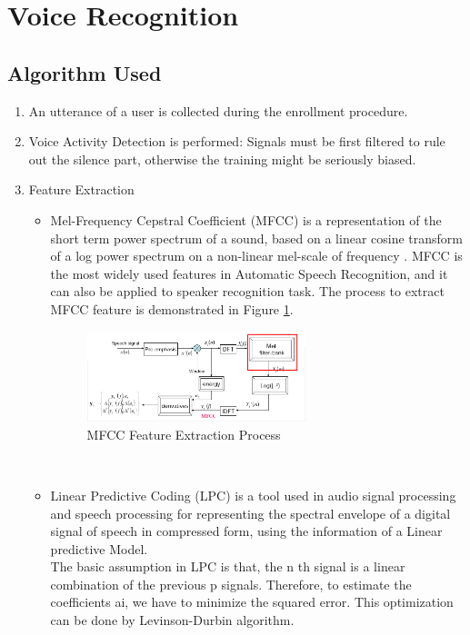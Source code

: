 
\section{Voice Recognition}

\subsection{Algorithm Used}
\begin{enumerate}
  \item An utterance of a user is collected during the enrollment procedure.
  \item Voice Activity Detection is performed: Signals must be first filtered to rule out the silence part, otherwise the training might be seriously biased.
  \item Feature Extraction
    \begin{itemize}
      \item Mel-Frequency Cepstral Coefficient (MFCC) is a representation of the short term power spectrum of a sound, based on a linear cosine transform of a log power spectrum on a non-linear mel-scale of frequency . MFCC is the most widely used features in Automatic Speech Recognition, and it can also be applied to speaker recognition task. The process to extract MFCC feature is demonstrated in Figure \ref{fig:MFCC_fig_one}. \\
      \begin{figure}[!t]
      \centering
      \includegraphics[width=2.5in]{./MFCC-mel-filterbank.png}
      \caption{MFCC Feature Extraction Process}
      \label{fig:MFCC_fig_one}
      \end{figure}
      \\
      \item Linear Predictive Coding (LPC) is a tool used in audio signal processing and speech processing for representing the spectral envelope of a digital signal of speech in compressed form, using the information of a Linear predictive Model. \\
      The basic assumption in LPC is that, the n th signal is a linear combination of the previous p signals. Therefore, to estimate the coefficients ai, we have to minimize the squared error. This optimization can be done by Levinson-Durbin algorithm.

\end{itemize}
\end{enumerate}
